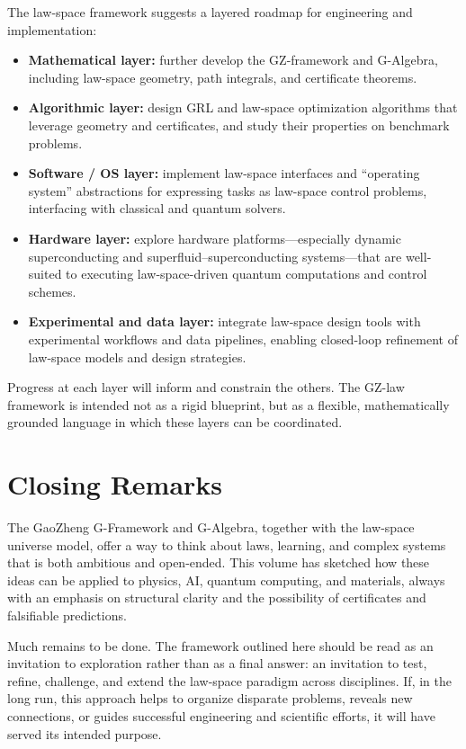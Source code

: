 \documentclass[11pt]{book}
\theoremstyle{plain}
\theoremstyle{definition}
\theoremstyle{remark}
\begin{document}
The law-space framework suggests a layered roadmap for engineering
and implementation:

\begin{itemize}
  \item \textbf{Mathematical layer:}
        further develop the GZ-framework and G-Algebra, including
        law-space geometry, path integrals, and certificate
        theorems.
  \item \textbf{Algorithmic layer:}
        design GRL and law-space optimization algorithms that
        leverage geometry and certificates, and study their
        properties on benchmark problems.
  \item \textbf{Software / OS layer:}
        implement law-space interfaces and ``operating system''
        abstractions for expressing tasks as law-space control
        problems, interfacing with classical and quantum solvers.
  \item \textbf{Hardware layer:}
        explore hardware platforms—especially dynamic superconducting
        and superfluid–superconducting systems—that are well-suited
        to executing law-space-driven quantum computations and
        control schemes.
  \item \textbf{Experimental and data layer:}
        integrate law-space design tools with experimental
        workflows and data pipelines, enabling closed-loop
        refinement of law-space models and design strategies.
\end{itemize}

Progress at each layer will inform and constrain the others. The
GZ-law framework is intended not as a rigid blueprint, but as a
flexible, mathematically grounded language in which these layers
can be coordinated.

\section*{Closing Remarks}


The GaoZheng G-Framework and G-Algebra, together with the law-space
universe model, offer a way to think about laws, learning, and
complex systems that is both ambitious and open-ended. This volume
has sketched how these ideas can be applied to physics, AI, quantum
computing, and materials, always with an emphasis on structural
clarity and the possibility of certificates and falsifiable
predictions.

Much remains to be done. The framework outlined here should be read
as an invitation to exploration rather than as a final answer: an
invitation to test, refine, challenge, and extend the law-space
paradigm across disciplines. If, in the long run, this approach
helps to organize disparate problems, reveals new connections, or
guides successful engineering and scientific efforts, it will have
served its intended purpose.
\end{document}
